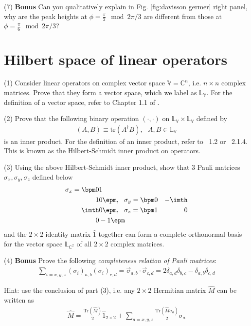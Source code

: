 (7) \textbf{Bonus} Can you qualitatively explain in Fig. \ref{fig:davisson germer} right panel, why are the peak heights at $\phi=\frac\pi2\mod2\pi/3$ are different from those at $\phi=\frac\pi6\mod2\pi/3$?

\section{Hilbert space of linear operators}

(1) Consider linear operators on complex vector space $\mathbb{V}=\mathbb{C}^n$, i.e. $n\times n$ complex matrices. Prove that they form a vector space, which we label as $\mathbb{L}_\mathbb{V}$. For the definition of a vector space, refer to Chapter 1.1 of \shankar.

(2) Prove that the following binary operation $(\cdot,\cdot)$ on $\mathbb{L}_\mathbb{V}\times \mathbb{L}_\mathbb{V}$ defined by
\begin{align}
(A,B)\equiv\text{tr}(A^\dagger B),~~~A,B\in\mathbb{L}_\mathbb{V}
\end{align}
is an inner product. For the definition of an inner product, refer to \shankar~1.2 or \nielsen~2.1.4. This is known as the Hilbert-Schmidt inner product on operators.

(3) Using the above Hilbert-Schmidt inner product, show that 3 Pauli matrices $\sigma_x,\sigma_y,\sigma_z$ defined below
\begin{align}
\sigma_x=\bpm0&1\\1&0\epm,~~\sigma_y=\bpm0&-\imth\\ \imth&0\epm,~~\sigma_z=\bpm1&0\\0&-1\epm
\end{align}
and the $2\times2$ identity matrix $\hat 1$ together can form a complete orthonormal basis for the vector space $\mathbb{L}_{\mathbb{C}^2}$ of all $2\times 2$ complex matrices.

(4) \textbf{Bonus} Prove the following \emph{completeness relation of Pauli matrices}:
\begin{align}
\sum_{i=x,y,z}(\sigma_i)_{a,b}(\sigma_i)_{c,d}=\vec\sigma_{a,b}\cdot\vec\sigma_{c,d}=2\delta_{a,d}\delta_{b,c}-\delta_{a,b}\delta_{c,d}
\end{align}

Hint: use the conclusion of part (3), i.e. any $2\times 2$ Hermitian matrix $\hat M$ can be written as
\begin{align}
\hat M=\frac{\text{Tr}(\hat M)}2\hat 1_{2\times2}+\sum_{a=x,y,z}\frac{\text{Tr}(\hat M\sigma_a)}2\sigma_a
\end{align}

